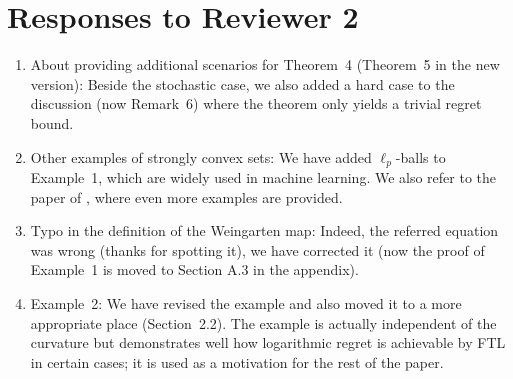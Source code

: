 \documentclass[10pt,english]{article}
\begin{document}
\section*{Responses to Reviewer 2}
\begin{enumerate}
\item About providing additional scenarios for Theorem~4 (Theorem~5 in the new version):
Beside the stochastic case, we also added a hard case to the discussion (now Remark~6) where the theorem only yields a trivial regret bound.
\item Other examples of strongly convex sets: We have added $\ell_p$-balls to Example~1, which are widely used in machine learning. We also refer to the paper of  \citet{garber2014faster}, where even more examples are provided.
\item Typo in the definition of the Weingarten map: Indeed, the referred equation was wrong (thanks for spotting it), we have corrected it (now the proof of Example~1 is moved to Section A.3 in the appendix).
\item Example~2: We have revised the example and also moved it to a more appropriate place (Section~2.2). The example is actually independent of the curvature but demonstrates well how logarithmic regret is achievable by FTL in certain cases; it is used as a motivation for the rest of the paper.
\end{enumerate}



\end{document}
